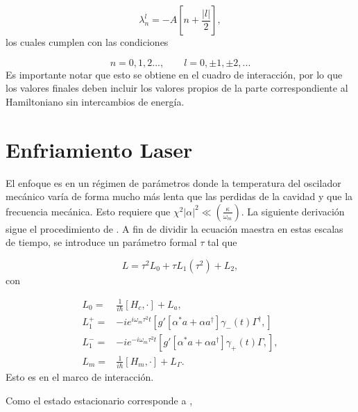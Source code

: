 \documentclass[10pt,a4paper]{report}
\begin{document}
\begin{equation}
\lambda_n^l = -A[n + \frac{|l|}{2}],
\end{equation} los cuales cumplen con las condiciones

\begin{equation}
n=0,1,2...,\qquad l = 0,\pm 1, \pm 2,... 
\end{equation}
Es importante notar que esto se obtiene en el cuadro de interacción,
por lo que los valores finales deben incluir los valores propios de la
parte correspondiente al Hamiltoniano sin intercambios de energía.

\section{Enfriamiento Laser}\label{LasCool}

El enfoque es en un régimen de parámetros donde la temperatura del oscilador mecánico varía de forma mucho más lenta que las perdidas de la cavidad y que la frecuencia mecánica. Esto requiere que $\chi^2 |\alpha|^2 \ll (\frac{\kappa}{\omega_m})$. La siguiente derivación sigue el procedimiento de  \cite{LCNooshi}. A fin de dividir la ecuación maestra en estas escalas de tiempo, se introduce un parámetro formal $\tau$ tal que

 
\begin{equation}
L = \tau^2 L_0 + \tau L_1(\tau^2) + L_2,
\end{equation} con

\begin{align*}
L_0 =& \frac{1}{i\hbar}[H_c,\cdot] + L_a,\\
L_1^+ =& -ie^{i\omega_m \tau^2 t}[g'[\alpha^* a + \alpha a^\dagger]\gamma_-(t)\Gamma^\dagger,]\\
L_1^- =&-ie^{-i\omega_m \tau^2 t}[g'[\alpha^* a + \alpha a^\dagger]\gamma_+(t)\Gamma,],\\
L_m =& \frac{1}{i\hbar}[H_m,\cdot] + L_\Gamma.
\end{align*}Esto es en el marco de interacción.


Como el estado estacionario corresponde a \cite{EnglertDB}, 
\end{document}

